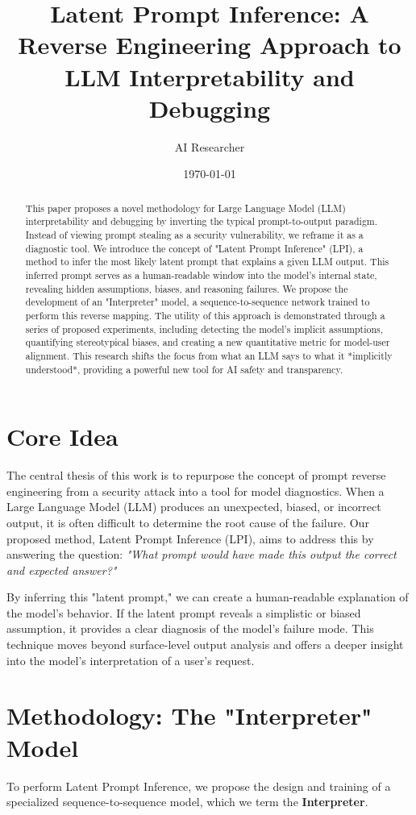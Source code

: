 \documentclass{article}
\title{\textbf{Latent Prompt Inference: A Reverse Engineering Approach to LLM Interpretability and Debugging}}
\author{AI Researcher}
\date{\today}
\begin{document}
\maketitle

\begin{abstract}
This paper proposes a novel methodology for Large Language Model (LLM) interpretability and debugging by inverting the typical prompt-to-output paradigm. Instead of viewing prompt stealing as a security vulnerability, we reframe it as a diagnostic tool. We introduce the concept of "Latent Prompt Inference" (LPI), a method to infer the most likely latent prompt that explains a given LLM output. This inferred prompt serves as a human-readable window into the model's internal state, revealing hidden assumptions, biases, and reasoning failures. We propose the development of an "Interpreter" model, a sequence-to-sequence network trained to perform this reverse mapping. The utility of this approach is demonstrated through a series of proposed experiments, including detecting the model's implicit assumptions, quantifying stereotypical biases, and creating a new quantitative metric for model-user alignment. This research shifts the focus from what an LLM says to what it *implicitly understood*, providing a powerful new tool for AI safety and transparency.
\end{abstract}

\section{Core Idea}
The central thesis of this work is to repurpose the concept of prompt reverse engineering from a security attack into a tool for model diagnostics. When a Large Language Model (LLM) produces an unexpected, biased, or incorrect output, it is often difficult to determine the root cause of the failure. Our proposed method, Latent Prompt Inference (LPI), aims to address this by answering the question: \textit{"What prompt would have made this output the correct and expected answer?"}

By inferring this "latent prompt," we can create a human-readable explanation of the model's behavior. If the latent prompt reveals a simplistic or biased assumption, it provides a clear diagnosis of the model's failure mode. This technique moves beyond surface-level output analysis and offers a deeper insight into the model's interpretation of a user's request.

\section{Methodology: The "Interpreter" Model}
To perform Latent Prompt Inference, we propose the design and training of a specialized sequence-to-sequence model, which we term the \textbf{Interpreter}.
\end{document}
